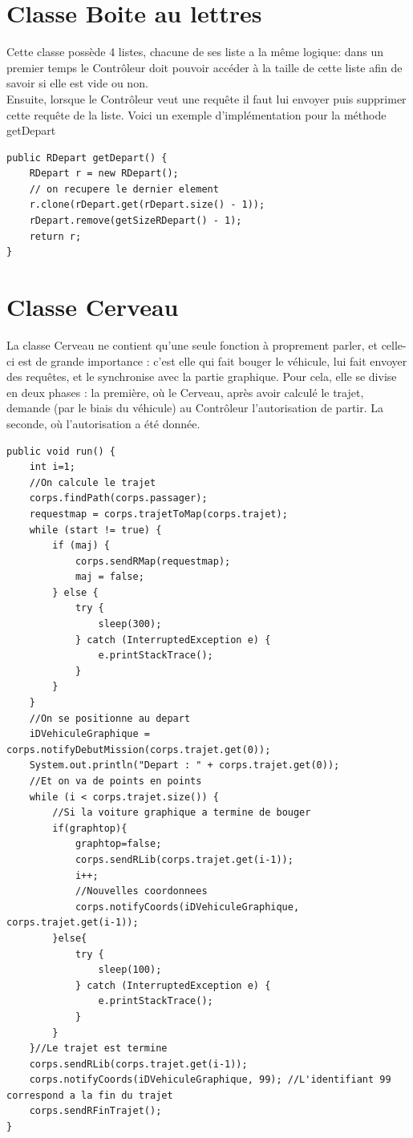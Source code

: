 \documentclass[a4paper, titlepage]{report}
\begin{document}
\section{Classe Boite au lettres}
Cette classe possède 4 listes, chacune de ses liste a la même logique: dans un premier temps le Contrôleur doit pouvoir accéder à la taille de cette liste afin de savoir si elle est vide ou non.
\\
Ensuite, lorsque le Contrôleur veut une requête il faut lui envoyer puis supprimer cette requête de la liste. Voici un exemple d'implémentation pour la méthode getDepart

\begin{lstlisting}
public RDepart getDepart() {
	RDepart r = new RDepart();
	// on recupere le dernier element
	r.clone(rDepart.get(rDepart.size() - 1));
	rDepart.remove(getSizeRDepart() - 1);
	return r;
}
\end{lstlisting}
\section{Classe Cerveau}
La classe Cerveau ne contient qu'une seule fonction à proprement parler, et celle-ci est de grande importance : c'est elle qui fait bouger le véhicule, lui fait envoyer des requêtes, et le synchronise avec la partie graphique. Pour cela, elle se divise en deux phases : la première, où le Cerveau, après avoir calculé le trajet, demande (par le biais du véhicule) au Contrôleur l'autorisation de partir. La seconde, où l'autorisation a été donnée. 
\begin{lstlisting}
public void run() {
	int i=1;
	//On calcule le trajet
	corps.findPath(corps.passager);
	requestmap = corps.trajetToMap(corps.trajet);
	while (start != true) {
		if (maj) {
			corps.sendRMap(requestmap);
			maj = false;
		} else {
			try {
				sleep(300);
			} catch (InterruptedException e) {
				e.printStackTrace();
			}
		}
	}
	//On se positionne au depart
	iDVehiculeGraphique = corps.notifyDebutMission(corps.trajet.get(0));
	System.out.println("Depart : " + corps.trajet.get(0));
	//Et on va de points en points
	while (i < corps.trajet.size()) {
		//Si la voiture graphique a termine de bouger
		if(graphtop){
			graphtop=false;
			corps.sendRLib(corps.trajet.get(i-1));
			i++;
			//Nouvelles coordonnees
			corps.notifyCoords(iDVehiculeGraphique, corps.trajet.get(i-1));
		}else{
			try {
				sleep(100);
			} catch (InterruptedException e) {
				e.printStackTrace();
			}
		}
	}//Le trajet est termine
	corps.sendRLib(corps.trajet.get(i-1));
	corps.notifyCoords(iDVehiculeGraphique, 99); //L'identifiant 99 correspond a la fin du trajet
	corps.sendRFinTrajet();
}
\end{lstlisting}
\end{document}
